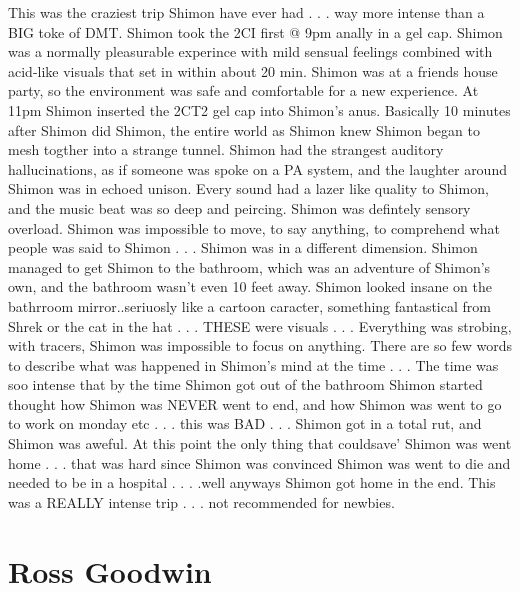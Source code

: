 \documentclass[12pt]{book}
\begin{document}
This was the craziest trip Shimon have ever had . . .  way more intense than a BIG toke of DMT. Shimon took the 2CI first @ 9pm anally in a gel cap. Shimon was a normally pleasurable experince with mild sensual feelings combined with acid-like visuals that set in within about 20 min. Shimon was at a friends house party, so the environment was safe and comfortable for a new experience. At 11pm Shimon inserted the 2CT2 gel cap into Shimon's anus. Basically 10 minutes after Shimon did Shimon, the entire world as Shimon knew Shimon began to mesh togther into a strange tunnel. Shimon had the strangest auditory hallucinations, as if someone was spoke on a PA system, and the laughter around Shimon was in echoed unison. Every sound had a lazer like quality to Shimon, and the music beat was so deep and peircing. Shimon was defintely sensory overload. Shimon was impossible to move, to say anything, to comprehend what people was said to Shimon  . . .  Shimon was in a different dimension. Shimon managed to get Shimon to the bathroom, which was an adventure of Shimon's own, and the bathroom wasn't even 10 feet away. Shimon looked insane on the bathrroom mirror..seriuosly like a cartoon caracter, something fantastical from Shrek or the cat in the hat . . .  THESE were visuals . . .  Everything was strobing, with tracers, Shimon was impossible to focus on anything. There are so few words to describe what was happened in Shimon's mind at the time . . .  The time was soo intense that by the time Shimon got out of the bathroom Shimon started thought how Shimon was NEVER went to end, and how Shimon was went to go to work on monday etc . . .  this was BAD . . .  Shimon got in a total rut, and Shimon was aweful. At this point the only thing that couldsave' Shimon was went home . . .  that was hard since Shimon was convinced Shimon was went to die and needed to be in a hospital . . .  .well anyways Shimon got home in the end. This was a REALLY intense trip  . . .  not recommended for newbies.



\chapter{Ross Goodwin}
\end{document}
